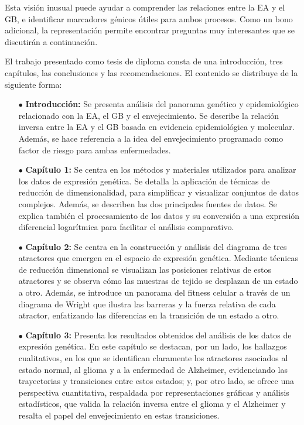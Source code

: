 Esta visión inusual puede ayudar a comprender las relaciones entre la EA y el GB, e identificar marcadores génicos útiles para ambos procesos. Como un bono adicional, la representación permite encontrar preguntas muy interesantes que se discutirán a continuación.

El trabajo presentado como tesis de diploma consta de una introducción, tres capítulos, las conclusiones y las recomendaciones. El contenido se distribuye de la siguiente forma:

\begin{itemize}
	\item[$\bullet$] \textbf{Introducción:} Se presenta análisis del panorama genético y epidemiológico relacionado con la EA, el GB y el envejecimiento. Se describe la relación inversa entre la EA y el GB basada en evidencia epidemiológica y molecular. Además, se hace referencia a la idea del envejecimiento programado como factor de riesgo para ambas enfermedades.
	
	\item[$\bullet$] \textbf{Capítulo 1:} Se centra en los métodos y materiales utilizados para analizar los datos de expresión genética. Se detalla la aplicación de técnicas de reducción de dimensionalidad, para simplificar y visualizar conjuntos de datos complejos. Además, se describen las dos principales fuentes de datos. Se explica también el procesamiento de los datos y su conversión a una expresión diferencial logarítmica para facilitar el análisis comparativo.
	
	\item[$\bullet$] \textbf{Capítulo 2:} Se centra en la construcción y análisis del diagrama de tres atractores que emergen en el espacio de expresión genética. Mediante técnicas de reducción dimensional se visualizan las posiciones relativas de estos atractores y se observa cómo las muestras de tejido se desplazan de un estado a otro. Además, se introduce un panorama del fitness celular a través de un diagrama de Wright que ilustra las barreras y la fuerza relativa de cada atractor, enfatizando las diferencias en la transición de un estado a otro.
	
	\item[$\bullet$] \textbf{Capítulo 3:} Presenta los resultados obtenidos del análisis de los datos de expresión genética. En este capítulo se destacan, por un lado, los hallazgos cualitativos, en los que se identifican claramente los atractores asociados al estado normal, al glioma y a la enfermedad de Alzheimer, evidenciando las trayectorias y transiciones entre estos estados; y, por otro lado, se ofrece una perspectiva cuantitativa, respaldada por representaciones gráficas y análisis estadísticos, que valida la relación inversa entre el glioma y el Alzheimer y resalta el papel del envejecimiento en estas transiciones.
	

\end{itemize}
